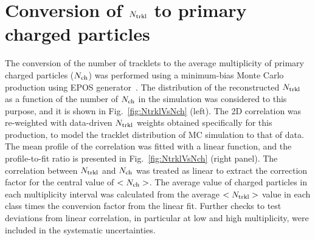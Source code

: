 \section {Conversion of $N_{\rm trkl}$ to primary charged particles}
\label{sec:NtrklToNch}
The conversion of the number of tracklets to the average multiplicity of primary charged particles ($N_{\rm ch}$) 
was performed using a minimum-bias Monte Carlo production using EPOS generator~\cite{Drescher:2000ha}. 
The distribution of the reconstructed $N_{\rm trkl}$ as a function of the number of
$N_{\rm ch}$ in the simulation was considered to this purpose, and it is shown in Fig.~\ref{fig:NtrklVsNch} (left).
The 2D correlation was re-weighted with data-driven $N_{\rm trkl}$ weights obtained
specifically for this production, to model the tracklet
distribution of MC simulation to that of data. 
The mean profile of the correlation was fitted with a linear function, and the profile-to-fit ratio
is presented in Fig.~\ref{fig:NtrklVsNch} (right panel). The correlation between $N_{\rm trkl}$ and $N_{\rm ch}$ 
was treated as linear to extract the correction factor for the central value of $<N_{\rm ch}>$.
The average value of charged particles in each multiplicity interval
was calculated from the average $<N_{\rm trkl}>$ value in each class 
times the conversion factor from the linear fit.
Further checks to test deviations from linear correlation, in particular at low and high multiplicity,
were included in the systematic uncertainties.\\



